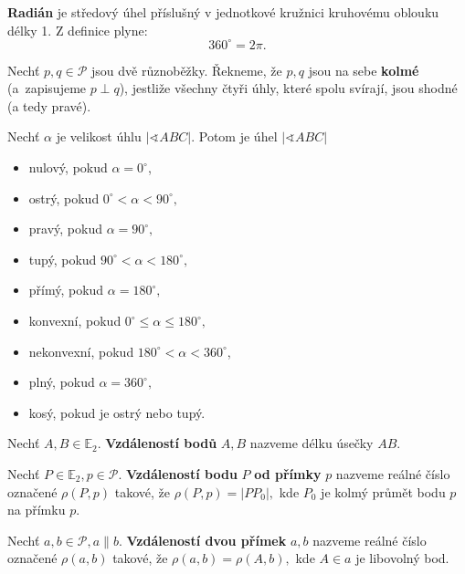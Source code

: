 \begin{pozn}
  \textbf{Radián} je středový úhel příslušný v jednotkové kružnici kruhovému oblouku délky 1. Z definice plyne:
  \[
    360^\circ = 2\pi.
  \]
\end{pozn}

\begin{definition}
  Nechť $p,q\in \mathscr P$ jsou dvě různoběžky. Řekneme, že $p,q$ jsou na sebe \textbf{kolmé} (a~zapisujeme $p\perp q$), jestliže všechny čtyři úhly, které spolu svírají, jsou shodné (a tedy pravé).
\end{definition}

\begin{pozn}
  Nechť $\alpha$ je velikost úhlu $|\sphericalangle ABC|$. Potom je úhel $|\sphericalangle ABC|$
  \begin{itemize}
    \item nulový, pokud $\alpha=0^\circ$,
  \item ostrý, pokud $0^\circ <\alpha < 90^\circ,$
  \item pravý, pokud $\alpha = 90^\circ,$
  \item tupý, pokud $90^\circ < \alpha < 180^\circ,$
  \item přímý, pokud $\alpha = 180^\circ,$
  \item konvexní, pokud $0^\circ \leq \alpha \leq 180^\circ,$
  \item nekonvexní, pokud $180^\circ < \alpha < 360^\circ$,
  \item plný, pokud $\alpha = 360^\circ,$
  \item kosý, pokud je ostrý nebo tupý.
  \end{itemize}
\end{pozn}

\begin{definition}
  Nechť $A,B\in \mathbb E_2$. \textbf{Vzdáleností bodů} $A,B$ nazveme délku úsečky $AB.$
\end{definition}


\begin{definition}
  Nechť $P\in \mathbb E_2, p \in \mathscr P.$ \textbf{Vzdáleností bodu} $P$ \textbf{od přímky} $p$ nazveme reálné číslo označené $\rho(P,p)$ takové, že $\rho(P,p)=|PP_0|,$ kde $P_0$ je kolmý průmět bodu $p$ na přímku $p$.
\end{definition}

\begin{definition}
  Nechť $a,b \in \mathscr P, a \parallel b.$ \textbf{Vzdáleností dvou přímek} $a,b$ nazveme reálné číslo označené $\rho(a,b)$ takové, že $\rho(a,b)=\rho(A,b),$ kde $A\in a$ je libovolný bod.
\end{definition}


